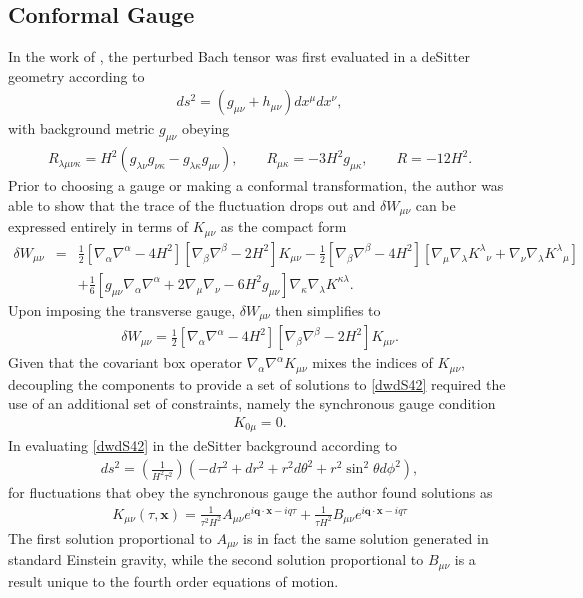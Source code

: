 \documentclass[10pt,letterpaper]{article}
\numberwithin{equation}{section}
\begin{document}
\subsection{Conformal Gauge}
\label{sec:Conformal Gauge}
In the work of \cite{Mannheim2012a}, the perturbed Bach tensor was first evaluated in a deSitter geometry according to
\begin{eqnarray}
ds^2 = (g_{\mu\nu}+h_{\mu\nu})dx^\mu dx^\nu,
\end{eqnarray}
with background metric $g_{\mu\nu}$ obeying
\begin{eqnarray}
R_{\lambda\mu\nu\kappa} = H^2 (g_{\lambda\nu}g_{\nu\kappa}-g_{\lambda\kappa}g_{\mu\nu}),
\qquad R_{\mu\kappa} = -3H^2 g_{\mu\kappa},\qquad R=-12H^2.
\end{eqnarray} 
Prior to choosing a gauge or making a conformal transformation, the author \cite{Mannheim2012a} was able to show that the trace of the fluctuation drops out and $\delta W_{\mu\nu}$ can be expressed entirely in terms of $K_{\mu\nu}$ as the compact form
\begin{eqnarray}
\delta W_{\mu\nu} &=& \tfrac{1}{2}\left[\nabla_\alpha\nabla^\alpha - 4H^2\right]\left[ \nabla_\beta\nabla^\beta-2H^2\right]K_{\mu\nu} - \tfrac{1}{2}\left[\nabla_\beta\nabla^\beta-4H^2\right]\left[\nabla_\mu\nabla_\lambda K^\lambda{}_\nu + \nabla_\nu\nabla_\lambda K^\lambda{}_\mu\right]
\nonumber\\
&&+\tfrac{1}{6} \left[g_{\mu\nu} \nabla_\alpha\nabla^\alpha + 2\nabla_\mu\nabla_\nu - 6H^2g_{\mu\nu}\right]\nabla_\kappa\nabla_\lambda K^{\kappa\lambda}.
\label{dwdS41}
\end{eqnarray}
Upon imposing the transverse gauge, $\delta W_{\mu\nu}$ then simplifies to 
\begin{eqnarray}
\delta W_{\mu\nu} = \tfrac{1}{2}\left[\nabla_\alpha\nabla^\alpha - 4H^2\right]\left[ \nabla_\beta\nabla^\beta-2H^2\right]K_{\mu\nu}.
\label{dwdS42}
\end{eqnarray}
Given that the covariant box operator $\nabla_\alpha\nabla^\alpha K_{\mu\nu}$ mixes the indices of $K_{\mu\nu}$, decoupling the components to provide a set of solutions to \eqref{dwdS42} required the use of an additional set of constraints, namely the synchronous gauge condition
\begin{eqnarray}
K_{0\mu} = 0.
\end{eqnarray}
In evaluating \eqref{dwdS42} in the deSitter background according to
\begin{eqnarray}
ds^2 = \left( \frac{1}{H^2\tau^2}\right) (-d\tau^2 + dr^2 + r^2d\theta^2 + r^2\sin^2\theta d\phi^2),
\end{eqnarray}
for fluctuations that obey the synchronous gauge the author \cite{Mannheim2012a} found solutions as
\begin{eqnarray}
K_{\mu\nu}(\tau,\mathbf x) = \frac{1}{\tau^2 H^2} A_{\mu\nu} e^{i\mathbf{q}\cdot\mathbf{x}-iq\tau}+\frac{1}{\tau H^2}B_{\mu\nu}  e^{i\mathbf{q}\cdot\mathbf{x}-iq\tau}
\end{eqnarray}
The first solution proportional to $A_{\mu\nu}$ is in fact the same solution generated in standard Einstein gravity, while the second solution proportional to $B_{\mu\nu}$ is a result unique to the fourth order equations of motion. 
\end{document}
